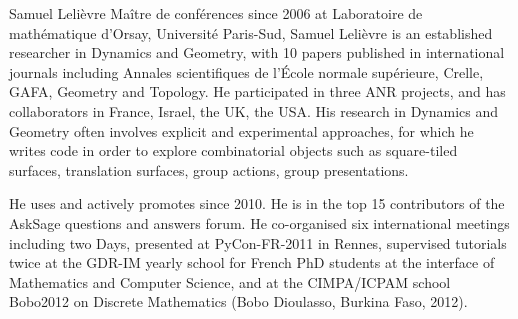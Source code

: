 \begin{participant}[type=R,PM=6,gender=male]{Samuel Lelièvre}
Maître de conférences since 2006 at
Laboratoire de mathématique d'Orsay, Université Paris-Sud,
Samuel Lelièvre is an established researcher in Dynamics and Geometry,
with 10 papers published in international journals including
Annales scientifiques de l'École normale supérieure,
Crelle, GAFA, Geometry and Topology.
He participated in three ANR projects, and has collaborators
in France, Israel, the UK, the USA.
His research in Dynamics and Geometry
often involves explicit and experimental approaches,
for which he writes code in order to explore
combinatorial objects such as square-tiled surfaces,
translation surfaces, group actions, group presentations.

He uses and actively promotes \Sage since 2010.
He is in the top 15 contributors of the AskSage
questions and answers forum.
He co-organised six international meetings including two \Sage Days,
presented \Sage at PyCon-FR-2011 in Rennes,
supervised \Sage tutorials twice at the GDR-IM yearly school
for French PhD students at the interface of Mathematics and
Computer Science, and at the CIMPA/ICPAM school Bobo2012
on Discrete Mathematics (Bobo Dioulasso, Burkina Faso, 2012).
\end{participant}
